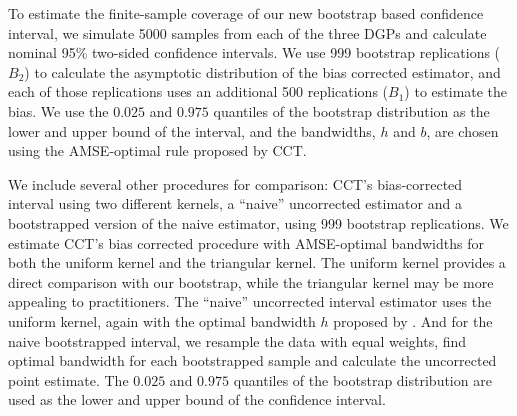 \documentclass[12pt,fleqn]{article}
\begin{document}
To estimate the finite-sample coverage of our new bootstrap based confidence interval, we
simulate 5000 samples from each of the three DGPs and calculate nominal 95\%
two-sided confidence intervals. We use 999 bootstrap replications ($B_2$) to
calculate the asymptotic distribution of the bias corrected estimator, and each
of those replications uses an additional 500 replications ($B_1$) to estimate
the bias. We use the $0.025$ and $0.975$ quantiles of the bootstrap distribution
as the lower and upper bound of the interval, and the bandwidths, $h$ and $b$,
are chosen using the AMSE-optimal rule proposed by CCT.

We include several other procedures for comparison: CCT's bias-corrected
interval using two different kernels, a ``naive'' uncorrected estimator and
a bootstrapped version of the naive estimator, using 999 bootstrap replications.
We estimate CCT's bias corrected procedure with AMSE-optimal bandwidths for both
the uniform kernel and the triangular kernel. The uniform kernel provides a
direct comparison with our bootstrap, while the triangular kernel may be more
appealing to practitioners. The ``naive'' uncorrected interval
estimator uses the uniform kernel, again with the optimal bandwidth $h$ proposed by
\cite{IK}. And for the naive bootstrapped interval, we resample the data with
equal weights, find optimal bandwidth for each bootstrapped sample and calculate
the uncorrected point estimate. The $0.025$ and $0.975$ quantiles of the bootstrap
distribution are used as the lower and upper bound of the confidence interval.
\end{document}

